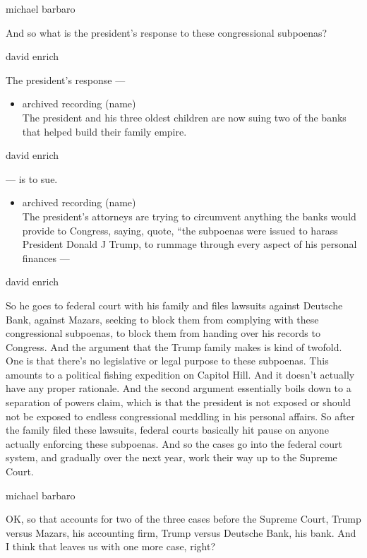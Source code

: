 michael barbaro

And so what is the president's response to these congressional
subpoenas?

david enrich

The president's response ---

\begin{itemize}
\tightlist
\item
  archived recording (name)\\
  The president and his three oldest children are now suing two of the
  banks that helped build their family empire.
\end{itemize}

david enrich

--- is to sue.

\begin{itemize}
\tightlist
\item
  archived recording (name)\\
  The president's attorneys are trying to circumvent anything the banks
  would provide to Congress, saying, quote, ``the subpoenas were issued
  to harass President Donald J Trump, to rummage through every aspect of
  his personal finances ---
\end{itemize}

david enrich

So he goes to federal court with his family and files lawsuits against
Deutsche Bank, against Mazars, seeking to block them from complying with
these congressional subpoenas, to block them from handing over his
records to Congress. And the argument that the Trump family makes is
kind of twofold. One is that there's no legislative or legal purpose to
these subpoenas. This amounts to a political fishing expedition on
Capitol Hill. And it doesn't actually have any proper rationale. And the
second argument essentially boils down to a separation of powers claim,
which is that the president is not exposed or should not be exposed to
endless congressional meddling in his personal affairs. So after the
family filed these lawsuits, federal courts basically hit pause on
anyone actually enforcing these subpoenas. And so the cases go into the
federal court system, and gradually over the next year, work their way
up to the Supreme Court.

michael barbaro

OK, so that accounts for two of the three cases before the Supreme
Court, Trump versus Mazars, his accounting firm, Trump versus Deutsche
Bank, his bank. And I think that leaves us with one more case, right?


